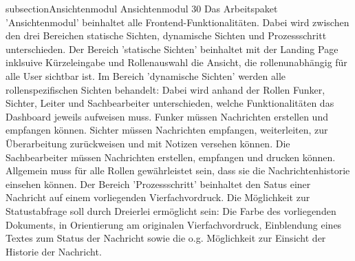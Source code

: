 subsection{Ansichtenmodul}
Ansichtenmodul 30%
Das Arbeitspaket 'Ansichtenmodul' beinhaltet alle Frontend-Funktionalitäten. 
Dabei wird zwischen den drei Bereichen statische Sichten, dynamische Sichten 
und Prozessschritt unterschieden. Der Bereich 'statische Sichten' beinhaltet 
mit der Landing Page inklsuive Kürzeleingabe und Rollenauswahl die Ansicht, 
die rollenunabhängig für alle User sichtbar ist.
Im Bereich 'dynamische Sichten' werden alle rollenspezifischen Sichten 
behandelt: Dabei wird anhand der Rollen Funker, Sichter, Leiter und 
Sachbearbeiter unterschieden, welche Funktionalitäten das Dashboard jeweils 
aufweisen muss. Funker müssen Nachrichten erstellen und empfangen können.
Sichter müssen Nachrichten empfangen, weiterleiten, zur Überarbeitung 
zurückweisen und mit Notizen versehen können. Die Sachbearbeiter müssen 
Nachrichten erstellen, empfangen und drucken können. 
Allgemein muss für alle Rollen gewährleistet sein, dass sie die 
Nachrichtenhistorie einsehen können. 
Der Bereich 'Prozessschritt' beinhaltet den Satus einer Nachricht 
auf einem vorliegenden Vierfachvordruck. Die Möglichkeit zur Statustabfrage 
soll durch Dreierlei ermöglicht sein: Die Farbe des vorliegenden Dokuments, 
in Orientierung am originalen Vierfachvordruck, Einblendung eines 
Textes zum Status der Nachricht sowie die o.g. Möglichkeit zur Einsicht der 
Historie der Nachricht.